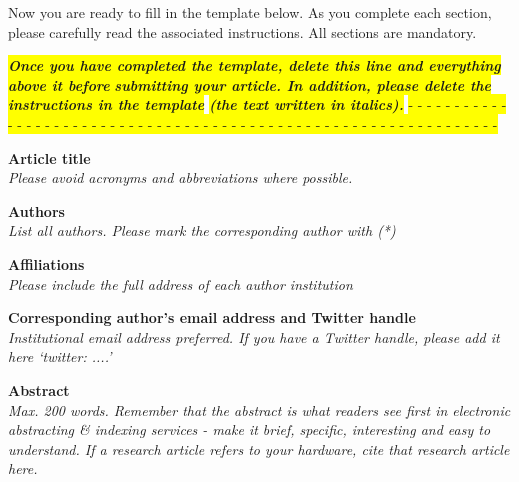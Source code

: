 \documentclass[11pt, letterpaper]{article}
\begin{document}
\begin{flushleft}
Now you are ready to fill in the template below. As you complete each section, please carefully read the associated instructions. All sections are mandatory.
\begin{center}
\colorbox{yellow}{\textbf{ \textit{ Once you have completed the template, delete this line and everything above it before} }}
\colorbox{yellow}{\textbf{ \textit{ submitting your article. In addition, please delete the instructions in the template}}} 
\colorbox{yellow}{\textbf{ \textit{  (the text written in italics).}}}
\colorbox{yellow}{- - - - - - - - - - - - - - - - - - - - - - - - - - - - - - - - - - - - - - - - - - - - - - - - - - - - - - - - - - - - - - - - }
\end{center}



\setlength{\parindent}{0pt}
\setlength{\parskip}{10pt}

\textbf{Article title}\\ \textit{Please avoid acronyms and abbreviations where possible.}

\textbf{Authors}\\ \textit{List all authors. Please mark the corresponding author with (*)}

\textbf{Affiliations}\\ \textit{Please include the full address of each author institution}

\textbf{Corresponding author’s email address and Twitter handle}\\ \textit{Institutional email address preferred. If you have a Twitter handle, please add it here ‘twitter: \@....’}

\textbf{Abstract}\\ \textit{Max. 200 words. Remember that the abstract is what readers see first in electronic abstracting \& indexing services - make it brief, specific, interesting and easy to understand. If a research article refers to your hardware, cite that research article here.}


\end{flushleft}
\end{document}
